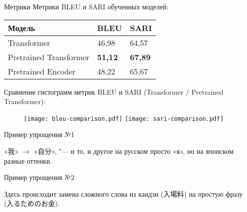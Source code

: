\begin{frame}[fragile]{Метрики}%
  Метрики BLEU и SARI обученных моделей:
  \begin{table}[H]
    \centering\small
    \label{metrics}
      \begin{tabular}{|l|l|l|}
        \hline
        \textbf{Модель} & \textbf{BLEU} & \textbf{SARI} \\ \hline
        Transformer & 46{,}98 & 64{,}57 \\ \hline
        Pretrained Transformer & \textbf{51{,}12} & \textbf{67{,}89} \\ \hline
        Pretrained Encoder & 48{,}22 & 65{,}67 \\ \hline
      \end{tabular}
      \normalsize
  \end{table}
  Сравнение гистограмм метрик BLEU и SARI ({\color{mathematicaYellow}Transformer} / {\color{mathematicaBlue}Pretrained Transformer}):
  \begin{figure}[H]%
    \centering%
    \label{metrics-comparison}
      \texttt{[image: bleu-comparison.pdf]}
      \texttt{[image: sari-comparison.pdf]}
  \end{figure}%
\end{frame}


\begin{frame}[fragile]{Пример упрощения №1}%



   «我» $\to$ «自分», "--- и то, и другое на русском просто «я», но на японском разные оттенки.
\end{frame}


\begin{frame}[fragile]{Пример упрощения №2}%



  Здесь происходит замена сложного слова из кандзи (入場料) на простую фразу (入るためのお金).
\end{frame}


